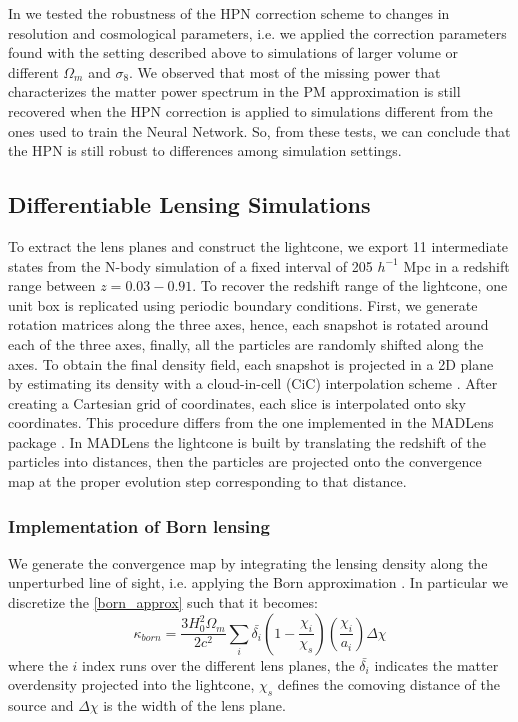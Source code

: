 \documentclass{aa}
\begin{document}
In \citet{lanzieri2022hybrid} we tested the robustness of the HPN correction scheme to changes in resolution and cosmological parameters, i.e. we applied the correction parameters found with the setting described above to simulations of larger volume or different $\Omega_m$ and $\sigma_8$. We observed that most of the missing power that characterizes the matter power spectrum in the PM approximation is still recovered when the HPN correction is applied to simulations different from the ones used to train the Neural Network. So, from these tests, we can conclude that the HPN is still robust to differences among simulation settings.


\subsection{Differentiable Lensing Simulations}
To extract the lens planes and construct the lightcone, we export 11 intermediate states from the N-body simulation of a fixed interval of 205 $h^{-1}$ Mpc in a redshift range between $z=0.03-0.91$. 
To recover the redshift range of the lightcone, one unit box is replicated using periodic boundary conditions. First, we generate rotation matrices along the three axes, hence, each snapshot is rotated around each of the three axes, finally, all the particles are randomly shifted along the axes. 
To obtain the final density field, each snapshot is projected in a 2D plane by estimating its density with a  cloud-in-cell (CiC) interpolation scheme \citep{hockney1988computer}. After creating a Cartesian grid of coordinates, each slice is interpolated onto sky coordinates. This procedure differs from the one implemented in the MADLens package \citep{bohm2021madlens}. In MADLens the lightcone is built by translating the redshift of the particles into distances, then the particles are projected onto the convergence map at the proper evolution step corresponding to that distance.



\subsubsection{Implementation of Born lensing}
We generate the convergence map by integrating the lensing density along the unperturbed line of sight, i.e. applying the Born approximation \citep{schneider2006weak}. In particular we discretize the \autoref{born_approx} such that it becomes:
\begin{equation} 
    \kappa_{born}= \frac{3H_0^2 \Omega_m}{2c^2}
    \sum_i 
    \bar{\delta_i} \left ( 1-\frac{\chi_i}{\chi_s}\right)
    \left (  \frac{\chi_i}{a_i}\right)
     \Delta \chi
\end{equation}
where the $i$ index runs over the different lens planes, the $\bar{\delta_i}$ indicates the matter overdensity projected into the lightcone, $\chi_s$ defines the comoving distance of the source and $\Delta \chi$ is the  width of the lens plane. 
\end{document}
